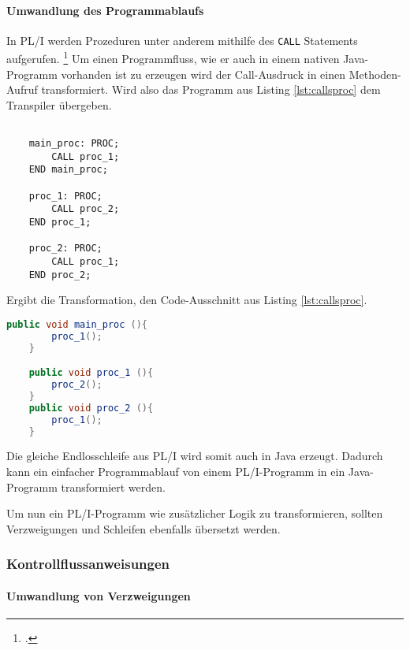 \paragraph{Umwandlung des Programmablaufs}

In PL/I werden Prozeduren unter anderem mithilfe des \verb+CALL+ Statements aufgerufen. \footcite[Vgl. ][S.133ff. ]{pliref} Um einen Programmfluss, wie er auch in einem nativen Java-Programm vorhanden ist zu erzeugen wird der Call-Ausdruck in einen Methoden-Aufruf transformiert. Wird also das Programm aus Listing \ref{lst:callsproc} dem Transpiler übergeben.

\begin{lstlisting}[language=PL/I, caption=\"Ubersetzung der Prozedur, label={lst:callsproc}]

	main_proc: PROC;
		CALL proc_1;
	END main_proc;

	proc_1: PROC;
		CALL proc_2;
	END proc_1;

	proc_2: PROC;
		CALL proc_1;
	END proc_2;

\end{lstlisting} 

Ergibt die Transformation, den Code-Ausschnitt aus Listing \ref{lst:callsproc}.

\begin{lstlisting}[language=Java, caption=\"Ubersetzung des Call-Statments, label={lst:javacallsproc}]
	public void main_proc (){
		proc_1();
	}

	public void proc_1 (){
		proc_2();
	}
	public void proc_2 (){
		proc_1();
	}
\end{lstlisting} 

Die gleiche Endlosschleife aus PL/I wird somit auch in Java erzeugt.
Dadurch kann ein einfacher Programmablauf von einem PL/I-Programm in ein Java-Programm transformiert werden.


Um nun ein PL/I-Programm wie zusätzlicher Logik zu transformieren, sollten Verzweigungen und Schleifen ebenfalls übersetzt werden.

\pagebreak
\subsubsection{Kontrollflussanweisungen}
\paragraph{Umwandlung von Verzweigungen}

